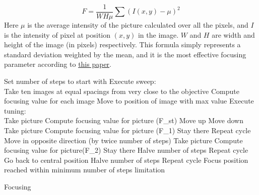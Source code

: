 \documentclass[a4paper]{article}
\begin{document}
		\[
		F = \frac{1}{W H \mu} \sum (I(x,y) - \mu )^2
		\]
			\noindent
			Here $\mu$ is the average intensity of the picture calculated over all the pixels, and $I$ is the intensity of pixel at position $(x,y)$ in the image.
			$W$ and $H$ are width and height of the image (in pixels) respectively.
			This formula simply represents a standard deviation weighted by the mean, and it is the most effective focusing parameter according to \href{http://www.researchgate.net/publication/4196112_Autofocusing_algorithm_selection_in_computer_microscopy/file/9c96051683d8b3a2d6.pdf}{this paper}.
		
		\vspace{12pt}
		\begin{algorithm}[H]
			\dontprintsemicolon
			\Begin
			{
				Set number of steps to start with\;
				\BlankLine
				Execute sweep:\\
				{
				\Indp Take ten images at equal spacings from very close to the objective\;
					Compute focusing value for each image\;
					Move to position of image with max value\;				
				}
				\BlankLine
				Execute tuning:\\
				{
					\BlankLine
					Take picture\;
					Compute focusing value for picture (F\_st)\;
					{Move up\;}
					\Else
					{Move down\;}
					\BlankLine
					Take picture\;
					Compute focusing value for picture (F\_1)\;
					{
						Stay there\;
						Repeat cycle\;
					}
					\Else
					{	
						Move in opposite direction (by twice number of steps)\;
						Take picture\;
						Compute focusing value for picture(F\_2)\;
						\BlankLine
						{
							Stay there\;
							Halve number of steps\;
							Repeat cycle\;
						}
						\Else
						{
							Go back to central position\;
							Halve number of steps\;
							Repeat cycle\;
						}
					}
				}
				Focus position reached within minimum number of steps limitation\;
			}
			\caption{Focusing}
		\end{algorithm}
		\vspace{12pt}
	
	
\end{document}
